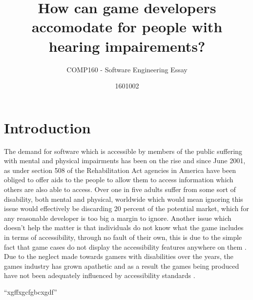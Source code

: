 \documentclass{scrartcl}
\title{How can game developers accomodate for people with hearing impairements?}
\subtitle{COMP160 - Software Engineering Essay}
\author{1601002}
\begin{document}
\maketitle


\section{Introduction}
The demand for software which is accessible by members of the public suffering with mental and physical impairments has been on the rise and since June 2001, as under section 508 of the Rehabilitation Act \cite{cohen2005accessibility} agencies in America have been obliged to offer aids to the people to allow them to access information which others are also able to access. Over one in five adults suffer from some sort of disability, both mental and physical, worldwide \cite{sierkowski2002achieving} which would mean ignoring this issue would effectively be discarding 20 percent of the potential market, which for any reasonable developer is too big a margin to ignore.  Another issue which doesn't help the matter is that individuals do not know what the game includes in terms of accessibility, through no fault of their own, this is due to the simple fact that game cases do not display the accessibility features anywhere on them \cite {bierre2005game}. Due to the neglect made towards gamers with disabilities over the years, the games industry has grown apathetic and as a result the games being produced have not been adequately influenced by accessibility standards \cite{porter2013empirical}.

``xgffxgcfgbcxgdf'' \cite[p. 3453]{porter2013empirical}
\end{document}
